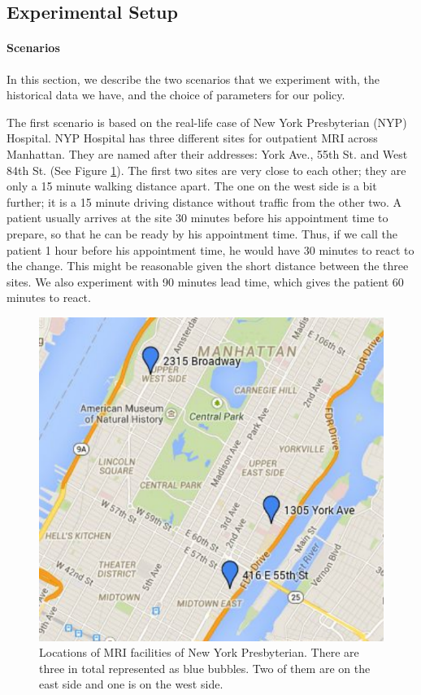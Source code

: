 \subsection{Experimental Setup}

\paragraph{Scenarios}

In this section, we describe the two scenarios that we experiment with,
the historical data we have, and the choice of parameters for our policy.

The first scenario is based on the real-life case of New York Presbyterian
(NYP) Hospital. NYP Hospital has three different sites for outpatient MRI
across Manhattan. They are named after their addresses: York Ave., 55th St. and
West 84th St. (See Figure \ref{fig:site}). The first two sites are very
close to each other; they are only a 15 minute walking distance apart. The one on the west side
is a bit further; it is a 15 minute driving distance without traffic from the other two.
A patient usually arrives at the site 30 minutes before his appointment
time to prepare, so that he can be ready by his appointment time.
Thus, if we call the patient 1 hour before his appointment time, he
would have 30 minutes to react to the change. This might be reasonable
given the short distance between the three sites. We also experiment with 90 minutes
lead time, which gives the patient 60 minutes to react.

\begin{figure}
\centering
\includegraphics[scale=.6]{chap3/numeric/pic/site.pdf}
\caption{Locations of MRI facilities of New York Presbyterian. There
are three in total represented as blue bubbles. Two of them are on
the east side and one is on the west side.}
\label{fig:site}
\end{figure}

